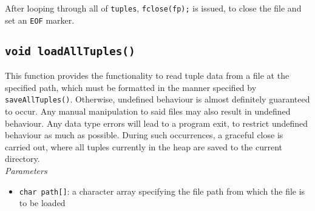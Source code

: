 \documentclass[10pt, a4paper, oneside]{memoir}
\begin{document}
	After looping through all of \texttt{tuples}, \texttt{fclose(fp);} is issued, to close the file and set an \texttt{EOF} marker.
	
	\subsection{\texttt{void loadAllTuples()}}
	
	This function provides the functionality to read tuple data from a file at the specified path, which must be formatted in the manner specified by \texttt{saveAllTuples()}. Otherwise, undefined behaviour is almost definitely guaranteed to occur. Any manual manipulation to said files may also result in undefined behaviour. Any data type errors will lead to a program exit, to restrict undefined behaviour as much as possible. During such occurrences, a graceful close is carried out, where all tuples currently in the heap are saved to the current directory.\\
	
	\textit{Parameters}
	\begin{itemize}[i.]
		\item  \texttt{char path[]}: a character array specifying the file path from which the file is to be loaded
	\end{itemize}
\end{document}
